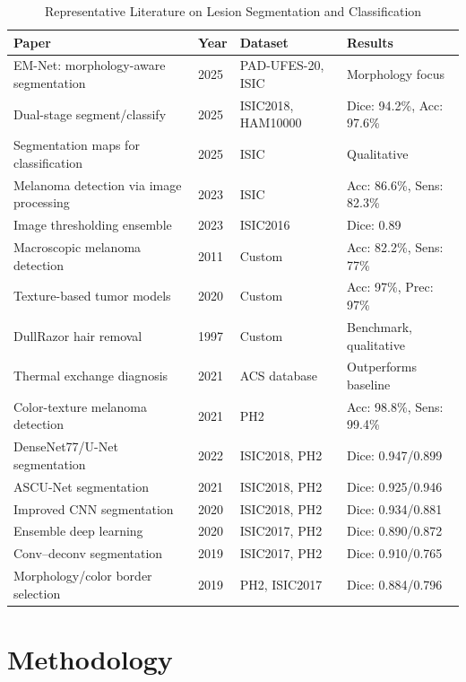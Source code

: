 \documentclass[conference]{IEEEtran}
\begin{document}
\begin{table}[htbp]
\small
\setlength{\tabcolsep}{2.3pt}
\renewcommand{\arraystretch}{1.15}
\caption{Representative Literature on Lesion Segmentation and Classification}
\centering
\begin{tabular}{|p{2.3cm}|p{0.75cm}|p{2.0cm}|p{1.65cm}|}
\hline
\textbf{Paper} & \textbf{Year} & \textbf{Dataset} & \textbf{Results} \\ \hline
EM-Net: morphology-aware segmentation & 2025 & PAD-UFES-20, ISIC & Morphology focus \\ \hline
Dual-stage segment/classify & 2025 & ISIC2018, HAM10000 & Dice: 94.2\%, Acc: 97.6\% \\ \hline
Segmentation maps for classification & 2025 & ISIC & Qualitative \\ \hline
Melanoma detection via image processing & 2023 & ISIC & Acc: 86.6\%, Sens: 82.3\% \\ \hline
Image thresholding ensemble & 2023 & ISIC2016 & Dice: 0.89 \\ \hline
Macroscopic melanoma detection & 2011 & Custom & Acc: 82.2\%, Sens: 77\% \\ \hline
Texture-based tumor models & 2020 & Custom & Acc: 97\%, Prec: 97\% \\ \hline
DullRazor hair removal & 1997 & Custom & Benchmark, qualitative \\ \hline
Thermal exchange diagnosis & 2021 & ACS database & Outperforms baseline \\ \hline
Color-texture melanoma detection & 2021 & PH2 & Acc: 98.8\%, Sens: 99.4\% \\ \hline
DenseNet77/U-Net segmentation & 2022 & ISIC2018, PH2 & Dice: 0.947/0.899 \\ \hline
ASCU-Net segmentation & 2021 & ISIC2018, PH2 & Dice: 0.925/0.946 \\ \hline
Improved CNN segmentation & 2020 & ISIC2018, PH2 & Dice: 0.934/0.881 \\ \hline
Ensemble deep learning & 2020 & ISIC2017, PH2 & Dice: 0.890/0.872 \\ \hline
Conv–deconv segmentation & 2019 & ISIC2017, PH2 & Dice: 0.910/0.765 \\ \hline
Morphology/color border selection & 2019 & PH2, ISIC2017 & Dice: 0.884/0.796 \\ \hline
\end{tabular}
\label{tab:compact_lit}
\end{table}

\section{Methodology}
\end{document}
